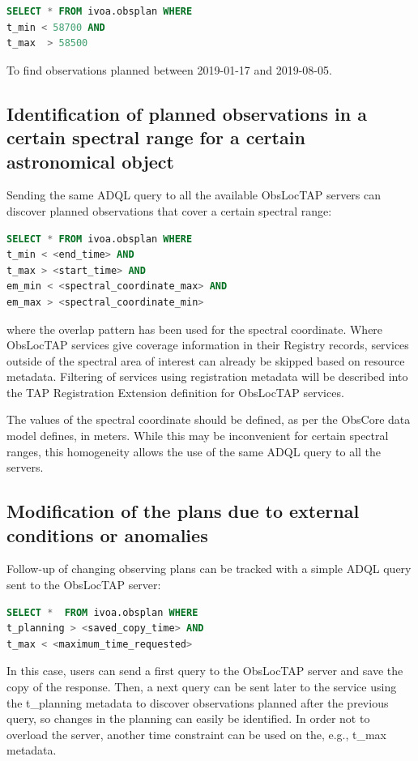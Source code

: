\documentclass[11pt,a4paper]{ivoa}
\begin{document}
\begin{lstlisting}[language=SQL]
SELECT * FROM ivoa.obsplan WHERE
t_min < 58700 AND
t_max  > 58500
\end{lstlisting}

To find observations planned between 2019-01-17 and 2019-08-05.

\subsection{Identification of planned observations in a certain spectral range for a certain astronomical object}
Sending the same ADQL query to all the available ObsLocTAP servers can discover planned observations that cover a certain spectral range:

\begin{lstlisting}[language=SQL]
SELECT * FROM ivoa.obsplan WHERE
t_min < <end_time> AND
t_max > <start_time> AND 
em_min < <spectral_coordinate_max> AND
em_max > <spectral_coordinate_min>
\end{lstlisting}
where the overlap pattern has been used for the spectral coordinate. 
Where ObsLocTAP services give coverage information in their Registry records,
services outside of the spectral area of interest can already be skipped based on resource metadata. Filtering of services using registration metadata will be
described into the TAP Registration Extension definition for ObsLocTAP services.
\par

The values of the spectral coordinate should be defined, as per the ObsCore data model defines, 
in meters. While this may be inconvenient for certain spectral ranges, this homogeneity 
allows the use of the same ADQL query to all the servers.

\subsection{Modification of the plans due to external conditions or anomalies}
Follow-up of changing observing plans can be tracked with a simple ADQL query sent to the 
ObsLocTAP server:


\begin{lstlisting}[language=SQL]
SELECT *  FROM ivoa.obsplan WHERE
t_planning > <saved_copy_time> AND
t_max < <maximum_time_requested>
\end{lstlisting}
In this case, users can send a first query to the ObsLocTAP server and save the copy of 
the response. Then, a next query can be sent later to the service using the t\_planning 
metadata to discover observations planned after the previous query, so changes in the 
planning can easily be identified. In order not to overload the server, another time 
constraint can be used on the, e.g., t\_max metadata.
\par
\end{document}
